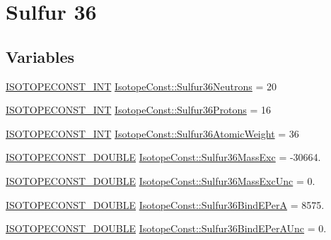 \hypertarget{group___isotope_const-_sulfur-_s36}{}\section{Sulfur 36}
\label{group___isotope_const-_sulfur-_s36}
\subsection*{Variables}
\begin{DoxyCompactItemize}
\item 
\mbox{\hyperlink{group___isotope_const-_macros_ga5f18360b3e99483a35c32d789e62621c}{I\+S\+O\+T\+O\+P\+E\+C\+O\+N\+S\+T\+\_\+\+I\+NT}} \mbox{\hyperlink{group___isotope_const-_sulfur-_s36_ga16fff151ed739fad2cf480c777947f7f}{Isotope\+Const\+::\+Sulfur36\+Neutrons}} = 20
\item 
\mbox{\hyperlink{group___isotope_const-_macros_ga5f18360b3e99483a35c32d789e62621c}{I\+S\+O\+T\+O\+P\+E\+C\+O\+N\+S\+T\+\_\+\+I\+NT}} \mbox{\hyperlink{group___isotope_const-_sulfur-_s36_ga880c61a595dbc5c34cc2b5799a82b14b}{Isotope\+Const\+::\+Sulfur36\+Protons}} = 16
\item 
\mbox{\hyperlink{group___isotope_const-_macros_ga5f18360b3e99483a35c32d789e62621c}{I\+S\+O\+T\+O\+P\+E\+C\+O\+N\+S\+T\+\_\+\+I\+NT}} \mbox{\hyperlink{group___isotope_const-_sulfur-_s36_gadbbe10b21abdf245e05c2d438a2e61ce}{Isotope\+Const\+::\+Sulfur36\+Atomic\+Weight}} = 36
\item 
\mbox{\hyperlink{group___isotope_const-_macros_ga8f45a7272ce02c0b4c65c44636ed719a}{I\+S\+O\+T\+O\+P\+E\+C\+O\+N\+S\+T\+\_\+\+D\+O\+U\+B\+LE}} \mbox{\hyperlink{group___isotope_const-_sulfur-_s36_gad6ecc4364b969c85fa5f47e68ddef2e1}{Isotope\+Const\+::\+Sulfur36\+Mass\+Exc}} = -\/30664.
\item 
\mbox{\hyperlink{group___isotope_const-_macros_ga8f45a7272ce02c0b4c65c44636ed719a}{I\+S\+O\+T\+O\+P\+E\+C\+O\+N\+S\+T\+\_\+\+D\+O\+U\+B\+LE}} \mbox{\hyperlink{group___isotope_const-_sulfur-_s36_ga5797f6cc2a8c2191f88e31cc3f14e39f}{Isotope\+Const\+::\+Sulfur36\+Mass\+Exc\+Unc}} = 0.
\item 
\mbox{\hyperlink{group___isotope_const-_macros_ga8f45a7272ce02c0b4c65c44636ed719a}{I\+S\+O\+T\+O\+P\+E\+C\+O\+N\+S\+T\+\_\+\+D\+O\+U\+B\+LE}} \mbox{\hyperlink{group___isotope_const-_sulfur-_s36_ga9d090133525a48cac125f0669b363554}{Isotope\+Const\+::\+Sulfur36\+Bind\+E\+PerA}} = 8575.
\item 
\mbox{\hyperlink{group___isotope_const-_macros_ga8f45a7272ce02c0b4c65c44636ed719a}{I\+S\+O\+T\+O\+P\+E\+C\+O\+N\+S\+T\+\_\+\+D\+O\+U\+B\+LE}} \mbox{\hyperlink{group___isotope_const-_sulfur-_s36_ga37d54f62595aabbdd0220510b72c5e04}{Isotope\+Const\+::\+Sulfur36\+Bind\+E\+Per\+A\+Unc}} = 0.

\end{DoxyCompactItemize}
